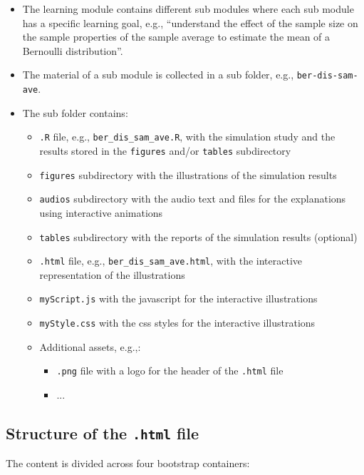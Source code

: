 \documentclass{article}
\begin{document}
\begin{itemize}
	\item The learning module contains different sub modules where each sub module has a specific learning goal, e.g., ``understand the effect of the sample size on the sample properties of the sample average to estimate the mean of a Bernoulli distribution''.
	\item The material of a sub module is collected in a sub folder, e.g., \texttt{ber-dis-sam-ave}.
	\item The sub folder contains:
	\begin{itemize}
		\item \texttt{.R} file, e.g., \texttt{ber\_dis\_sam\_ave.R}, with the simulation study and the results stored in the \texttt{figures} and/or \texttt{tables} subdirectory
		\item \texttt{figures} subdirectory with the illustrations of the simulation results
		\item \texttt{audios} subdirectory with the audio text and files for the explanations using interactive animations
		\item \texttt{tables} subdirectory with the reports of the simulation results (optional)
		\item \texttt{.html} file, e.g., \texttt{ber\_dis\_sam\_ave.html}, with the interactive representation of the illustrations
		\item \texttt{myScript.js} with the javascript for the interactive illustrations
		\item \texttt{myStyle.css} with the css styles for the interactive illustrations
		\item Additional assets, e.g.,:
		\begin{itemize}
			\item \texttt{.png} file with a logo for the header of the \texttt{.html} file
			\item ...
		\end{itemize}
	\end{itemize}
\end{itemize}

\subsection{Structure of the \texttt{.html} file}

The content is divided across four bootstrap containers:
\end{document}
